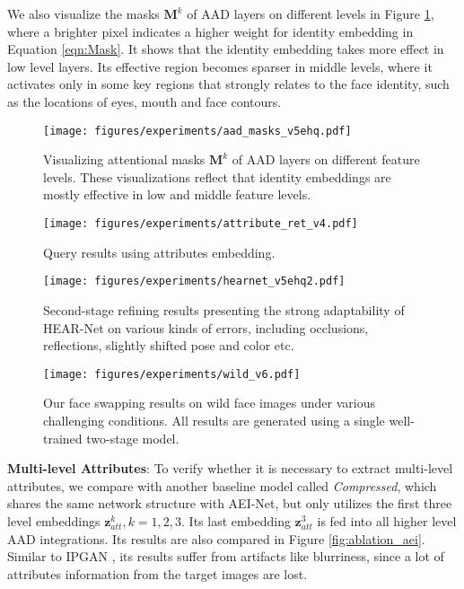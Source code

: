 We also visualize the masks $\bm{M}^k$ of AAD layers on different levels in Figure \ref{fig:visualize_aad_masks}, where a brighter pixel indicates a higher weight for identity embedding in Equation \ref{eqn:Mask}. It shows that the identity embedding takes more effect in low level layers. Its effective region becomes sparser in middle levels, where it activates only in some key regions that strongly relates to the face identity, such as the locations of eyes, mouth and face contours.

\begin{figure}[t]
\centering
 \texttt{[image: figures/experiments/aad\_masks\_v5ehq.pdf]}
    \caption{Visualizing attentional masks $\bm{M}^k$ of AAD layers on different feature levels. These visualizations reflect that identity embeddings are mostly effective in low and middle feature levels.}
\label{fig:visualize_aad_masks}
\end{figure}

\begin{figure}[t]
\centering
 \texttt{[image: figures/experiments/attribute\_ret\_v4.pdf]}
 \footnotesize
    \caption{Query results using attributes embedding.}
\label{fig:att_query}
\vspace{-0.5em}
\end{figure}

\begin{figure*}[t]
\centering
\texttt{[image: figures/experiments/hearnet\_v5ehq2.pdf]}
\caption{Second-stage refining results presenting the strong adaptability of HEAR-Net on various kinds of errors, including occlusions, reflections, slightly shifted pose and color etc.}
\label{fig:effect_of_hear}
\end{figure*}

\begin{figure*}[t]
\centering
 \texttt{[image: figures/experiments/wild\_v6.pdf]}
    \caption{Our face swapping results on wild face images under various challenging conditions. All results are generated using a single well-trained two-stage model.}
\label{fig:wild}
\vspace{-0.5em}
\end{figure*}

\noindent\textbf{Multi-level Attributes}:
To verify whether it is necessary to extract multi-level attributes, we compare with another baseline model called \emph{Compressed}, which shares the same network structure with AEI-Net, 
but only utilizes the first three level embeddings $\bm{z}_{att}^k, k=1,2,3$. Its last embedding $\bm{z}_{att}^3$ is fed into all higher level AAD integrations.  
Its results are also compared in Figure \ref{fig:ablation_aei}. Similar to IPGAN \cite{Bao_ipgan}, its results suffer from artifacts like blurriness, since a lot of attributes information from the target images are lost. 

